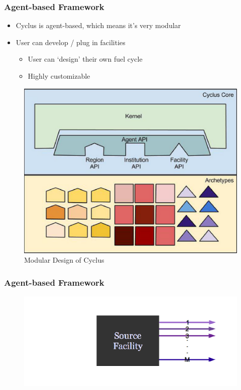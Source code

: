 \begin{frame}
	\frametitle{Agent-based Framework}
	\begin{itemize}
		\item Cyclus is agent-based, which means it's very modular
		\item User can develop / plug in facilities
			\begin{itemize}
				\item User can `design' their own fuel cycle
				\item Highly customizable
			\end{itemize}
	\end{itemize}
	\begin{figure}[htbp!]
        \begin{center}
                \includegraphics[width=.6\textwidth]{./images/cyclus_structure.png}
        \end{center}
        \caption{Modular Design of Cyclus}
        \label{fig:cyclus_struc}

	\end{figure}
\end{frame}

\begin{frame}
	\frametitle{Agent-based Framework}
	\begin{figure}[htbp!]
        \begin{center}
                \includegraphics[width=\textwidth]{./images/source.png}
        \end{center}
	\end{figure}
\end{frame}

